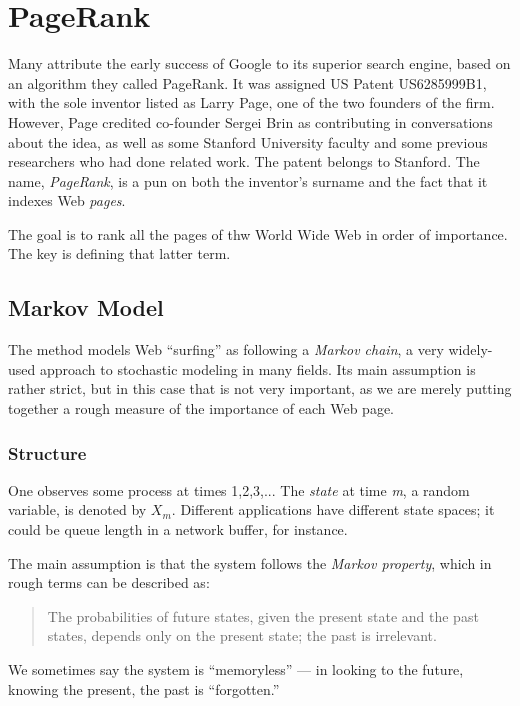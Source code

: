 \chapter{PageRank}  
\label{chap:page}

Many attribute the early success of Google to its superior search
engine, based on an algorithm they called PageRank.  It was assigned US
Patent US6285999B1, with the sole inventor listed as Larry Page, one of
the two founders of the firm.  However, Page credited co-founder Sergei
Brin as contributing in conversations about the idea, as well as some
Stanford University faculty and some previous researchers who had done
related work.  The patent belongs to Stanford.  The name,
\textit{PageRank}, is a pun on both the inventor's surname and the fact
that it indexes Web \textit{pages}.

The goal is to rank all the pages of thw World Wide Web in order of
importance.  The key is defining that latter term.

\section{Markov Model}

The method models Web ``surfing'' as following a \textit{Markov chain}, a
very widely-used approach to stochastic modeling in many fields.
Its main assumption is rather strict, but in this case that is not very
important, as we are merely putting together a rough measure of the
importance of each Web page.

\subsection{Structure}

One observes some process at times 1,2,3,...  The \textit{state} at time
\textit{m}, a random variable, is denoted by $X_m$.  Different
applications have different state spaces; it could be queue length in a
network buffer, for instance.

The main assumption is that the system follows the \textit{Markov property},
which in rough terms can be described as:

\begin{quote}
The probabilities of future states, given the present state and the past
states, depends only on the present state; the past is irrelevant.
\end{quote}

We sometimes say the system is ``memoryless'' --- in looking to the
future, knowing the present, the past is ``forgotten.''


